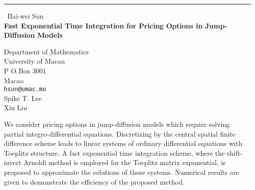 \documentclass{report}
\begin{document}
\begin{center}
\rule{6in}{1pt} \
{\large Hai-wei Sun \\
{\bf Fast Exponential Time Integration for Pricing Options in Jump-Diffusion Models}}

Department of Mathematics \\ University of Macau \\ P O Box 3001 \\ Macao
\\
{\tt hsun@umac.mo}\\
Spike T. Lee\\
Xin Liu\end{center}

We consider pricing options in jump-diffusion models which require
solving partial integro-differential equations. Discretizing by the
central spatial finite difference scheme leads to linear systems of
ordinary differential equations with Toeplitz structure. A fast
exponential time integration scheme, where the shift-invert Arnoldi
method is employed for the Toeplitz matrix exponential, is proposed to
approximate the solutions of those systems. Numerical results are given
to demonstrate the efficiency of the proposed method.
\end{document}
